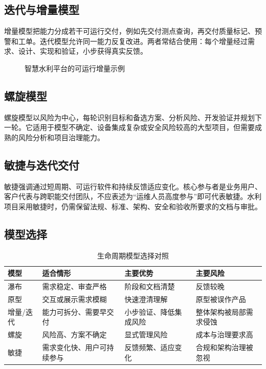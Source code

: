 \subsection{迭代与增量模型}

增量模型把能力分成若干可运行交付，例如先交付测点查询，再交付质量标记、预警和工单。迭代模型允许同一能力反复改进。两者常结合使用：每个增量经过需求、设计、实现和验证，小步获得真实反馈。

\begin{figure}[htbp]
\centering
{}
\caption{智慧水利平台的可运行增量示例}
\label{fig:incremental-model}
\end{figure}

\subsection{螺旋模型}

螺旋模型以风险为中心，每轮识别目标和备选方案、分析风险、开发验证并规划下一轮。它适用于模型不确定、设备集成复杂或安全风险较高的大型项目，但需要成熟的风险分析和项目治理能力。

\subsection{敏捷与迭代交付}

敏捷强调通过短周期、可运行软件和持续反馈适应变化\cite{agile2001}。核心参与者是业务用户、客户代表与跨职能交付团队，不应表述为“运维人员高度参与”即可代表敏捷。水利项目采用敏捷时，仍需保留法规、标准、架构、安全和验收所要求的文档与审批。

\subsection{模型选择}

\begin{table}[htbp]
\centering
\caption{生命周期模型选择对照}
\label{tab:lifecycle-comparison}
\begin{tabular}{p{2.0cm}p{3.4cm}p{3.8cm}p{3.4cm}}
\toprule
模型 & 适合情形 & 主要优势 & 主要风险 \\
\midrule
瀑布 & 需求稳定、审查严格 & 阶段和文档清楚 & 反馈较晚 \\
原型 & 交互或展示需求模糊 & 快速澄清理解 & 原型被误作产品 \\
增量/迭代 & 能力可拆分、需要早交付 & 小步验证、降低集成风险 & 整体架构被局部需求侵蚀 \\
螺旋 & 风险高、方案不确定 & 显式管理风险 & 成本与治理要求高 \\
敏捷 & 需求变化快、用户可持续参与 & 反馈频繁、适应变化 & 合规和架构治理被忽视 \\
\bottomrule
\end{tabular}
\end{table}

